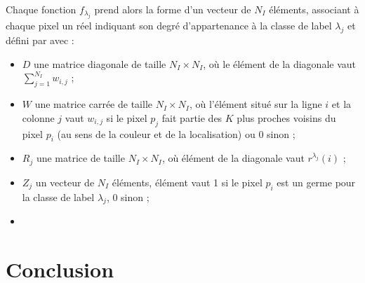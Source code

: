 Chaque fonction $f_{\lambda_{j}}$ prend alors la forme d'un vecteur de $N_{I}$ éléments, associant à chaque pixel un réel indiquant son degré d'appartenance à la classe de label $\lambda_{j}$ et défini par
avec :
\begin{itemize}
\item $D$ une matrice diagonale de taille $N_{I} \times N_{I}$, où le  élément de la diagonale vaut $\sum_{j=1}^{N_{I}} w_{i,j} $ ;
\item $W$ une matrice carrée de taille  $N_{I} \times N_{I}$, où l'élément situé sur la ligne $i$ et la colonne $j$ vaut $w_{i,j}$ si le pixel $p_{j}$ fait partie des $K$ plus proches voisins du pixel $p_{i}$ (au sens de la couleur et de la localisation) ou $0$ sinon ;
\item $R_{j}$ une matrice de taille $N_{I} \times N_{I}$, où  élément de la diagonale vaut $r^{\lambda_{j}}(i)$ ;
\item $Z_{j}$ un vecteur de $N_{I}$ éléments,  élément vaut 1 si le pixel $p_{i}$ est un germe pour la classe de label $\lambda_{j}$, 0 sinon ;
\item {}
\end{itemize}

\section{Conclusion}

